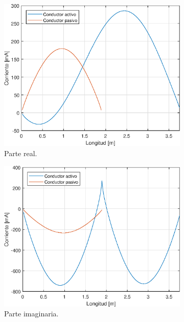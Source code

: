\begin{figure}[H]
	\begin{subfigure}{0.5\textwidth}
		\includegraphics[scale=0.6]{imagenes/i_real_80.eps}
		\caption{Parte real.}
		\label{fig.i_real_80}
	\end{subfigure}
	\quad
	\begin{subfigure}{0.5\textwidth}
		\includegraphics[scale=0.6]{imagenes/i_imag_80.eps}
		\caption{Parte imaginaria.}
		\label{fig.i_imag_80}
	\end{subfigure}
	\quad
	\begin{subfigure}{0.5\textwidth}

\end{subfigure}
\end{figure}
